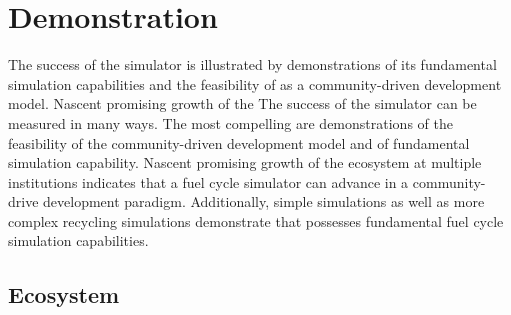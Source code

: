 \section{Demonstration}
%

%



The success of the \Cyclus simulator is illustrated by demonstrations
of its fundamental simulation capabilities and the feasibility of \Cyclus
as a community-driven development model.
Nascent promising growth of the \Cyclus 
The success of the \Cyclus simulator can be measured in many ways. 
The most compelling are demonstrations of the feasibility of the \Cyclus community-driven development 
model and of fundamental simulation capability. Nascent promising growth of the \Cyclus 
ecosystem at multiple institutions indicates that a fuel cycle simulator can 
advance in a community-drive development paradigm. Additionally, simple 
simulations as well as more complex recycling simulations demonstrate that 
\Cyclus possesses fundamental fuel cycle simulation capabilities.

\subsection{Ecosystem}

